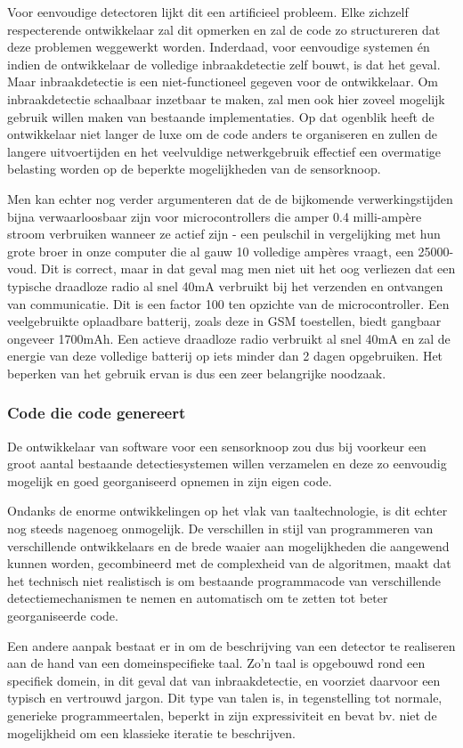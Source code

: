 \documentclass[DIV=calc,paper=a4,fontsize=11pt,twocolumn,draft]{scrartcl}
\newcommand{\heading}[1]{
\subsubsection*{#1}
\vspace{-2mm}
}
\begin{document}
Voor eenvoudige detectoren lijkt dit een artificieel probleem. Elke zichzelf
respecterende ontwikkelaar zal dit opmerken en zal de code zo structureren dat
deze problemen weggewerkt worden. Inderdaad, voor eenvoudige systemen \'en
indien de ontwikkelaar de volledige inbraakdetectie zelf bouwt, is dat het
geval. Maar inbraakdetectie is een niet-functioneel gegeven voor de
ontwikkelaar. Om inbraakdetectie schaalbaar inzetbaar te maken, zal men ook
hier zoveel mogelijk gebruik willen maken van bestaande implementaties. Op dat
ogenblik heeft de ontwikkelaar niet langer de luxe om de code anders te
organiseren en zullen de langere uitvoertijden en het veelvuldige
netwerkgebruik effectief een overmatige belasting worden op de beperkte
mogelijkheden van de sensorknoop.

Men kan echter nog verder argumenteren dat de de bijkomende verwerkingstijden
bijna verwaarloosbaar zijn voor microcontrollers die amper 0.4 milli-amp\`ere
stroom verbruiken wanneer ze actief zijn - een peulschil in vergelijking met
hun grote broer in onze computer die al gauw 10 volledige amp\`eres vraagt, een
25000-voud. Dit is correct, maar in dat geval mag men niet uit het oog
verliezen dat een typische draadloze radio al snel 40mA verbruikt bij het
verzenden en ontvangen van communicatie. Dit is een factor 100 ten opzichte van
de microcontroller. Een veelgebruikte oplaadbare batterij, zoals deze in GSM
toestellen, biedt gangbaar ongeveer 1700mAh. Een actieve draadloze radio
verbruikt al snel 40mA en zal de energie van deze volledige batterij op iets
minder dan 2 dagen opgebruiken. Het beperken van het gebruik ervan is dus een
zeer belangrijke noodzaak.

\heading{Code die code genereert}

De ontwikkelaar van software voor een sensorknoop zou dus bij voorkeur een
groot aantal bestaande detectiesystemen willen verzamelen en deze zo eenvoudig
mogelijk en goed georganiseerd opnemen in zijn eigen code.

Ondanks de enorme ontwikkelingen op het vlak van taaltechnologie, is dit echter
nog steeds nagenoeg onmogelijk. De verschillen in stijl van programmeren van
verschillende ontwikkelaars en de brede waaier aan mogelijkheden die aangewend
kunnen worden, gecombineerd met de complexheid van de algoritmen, maakt dat het
technisch niet realistisch is om bestaande programmacode van verschillende
detectiemechanismen te nemen en automatisch om te zetten tot beter
georganiseerde code.

Een andere aanpak bestaat er in om de beschrijving van een detector te
realiseren aan de hand van een domeinspecifieke taal. Zo'n taal is opgebouwd
rond een specifiek domein, in dit geval dat van inbraakdetectie, en voorziet
daarvoor een typisch en vertrouwd jargon. Dit type van talen is, in
tegenstelling tot normale, generieke programmeertalen, beperkt in zijn
expressiviteit en bevat bv. niet de mogelijkheid om een klassieke iteratie te
beschrijven.
\end{document}
